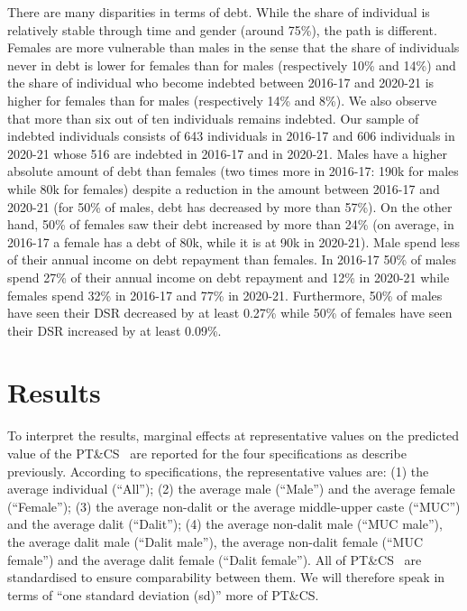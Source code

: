 \documentclass[a4paper, 12pt, onecolumn]{article}
\newcommand{\PTCS}{PT\&CS}
\begin{document}
There are many disparities in terms of debt.
While the share of individual is relatively stable through time and gender (around 75\%), the path is different.
Females are more vulnerable than males in the sense that the share of individuals never in debt is lower for females than for males (respectively 10\% and 14\%) and the share of individual who become indebted between 2016-17 and 2020-21 is higher for females than for males (respectively 14\% and 8\%).
We also observe that more than six out of ten individuals remains indebted.
Our sample of indebted individuals consists of 643 individuals in 2016-17 and 606 individuals in 2020-21 whose 516 are indebted in 2016-17 and in 2020-21.
Males have a higher absolute amount of debt than females (two times more in 2016-17: \rupee190k for males while \rupee80k for females) despite a reduction in the amount between 2016-17 and 2020-21 (for 50\% of males, debt has decreased by more than 57\%).
On the other hand, 50\% of females saw their debt increased by more than 24\% (on average, in 2016-17 a female has a debt of \rupee80k, while it is at \rupee90k in 2020-21).
Male spend less of their annual income on debt repayment than females.
In 2016-17 50\% of males spend 27\% of their annual income on debt repayment and 12\% in 2020-21 while females spend 32\% in 2016-17 and 77\% in 2020-21.
Furthermore, 50\% of males have seen their DSR decreased by at least 0.27\% while 50\% of females have seen their DSR increased by at least 0.09\%.








\section{Results}
\label{section:results}

To interpret the results, marginal effects at representative values on the predicted value of the \PTCS~ are reported for the four specifications as describe previously.
According to specifications, the representative values are: (1) the average individual (``All''); (2) the average male (``Male'') and the average female (``Female''); (3) the average non-dalit or the average middle-upper caste (``MUC'') and the average dalit (``Dalit''); (4) the average non-dalit male (``MUC male''), the average dalit male (``Dalit male''), the average non-dalit female (``MUC female'') and the average dalit female (``Dalit female'').
All of \PTCS~ are standardised to ensure comparability between them.
We will therefore speak in terms of ``one standard deviation (sd)'' more of \PTCS.
\end{document}
